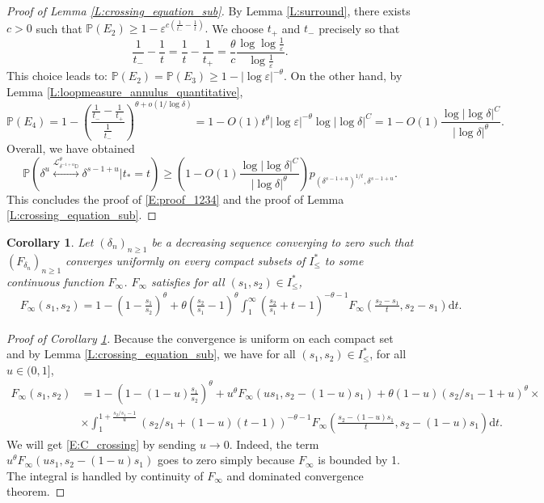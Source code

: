 \documentclass[11pt]{article}
\newtheorem{corollary}[theorem]{Corollary}
\theoremstyle{remark}
\newcommand{\D}{\mathbb{D}}
\newcommand{\Lc}{\mathcal{L}}
\newcommand{\Prob}[1]{\mathbb{P} \left( #1 \right) }
\newcommand{\eps}{\varepsilon}
\renewcommand{\d}{\mathrm{d}}
\numberwithin{equation}{section}
\begin{document}
\begin{proof}[Proof of Lemma \ref{L:crossing_equation_sub}]
By Lemma \ref{L:surround}, there exists $c>0$ such that
$
\Prob{ E_2 } \geq 1 - \eps^{c (\frac{1}{t_-} - \frac1t)}.
$
We choose $t_+$ and $t_-$ precisely so that
\[
\frac{1}{t_-} - \frac{1}{t} = \frac1t - \frac{1}{t_+} = \frac{\theta}{c} \frac{\log \log \frac1\eps}{\log \frac1\eps}.
\]
This choice leads to:
$\Prob{ E_2 } = \Prob{E_3} \geq 1 - |\log \eps|^{-\theta}.$
On the other hand, by Lemma \ref{L:loopmeasure_annulus_quantitative},
\[
\Prob{ E_4 } = 1 - \left( \frac{\frac{1}{t_-} - \frac{1}{t_+}}{ \frac{1}{t_-} } \right)^{\theta + o(1/\log \delta)} = 1 - O(1) t^{\theta} |\log \eps|^{-\theta} \log |\log \delta|^C = 1 - O(1) \frac{\log |\log \delta|^C}{|\log \delta|^\theta}.
\]
Overall, we have obtained 
\[
\Prob{ \delta^u \overset{\Lc_{\delta^{-1+u} \D}^\theta}{\longleftrightarrow} \delta^{s-1+u} \Big\vert t_* = t}
\geq \left( 1 - O(1) \frac{\log |\log \delta|^C}{|\log \delta|^\theta} \right) p_{(\delta^{s-1+u})^{1/t},\delta^{s-1+u}}.
\]
This concludes the proof of \eqref{E:proof_1234} and the proof of Lemma \ref{L:crossing_equation_sub}.
\end{proof}



\begin{corollary}\label{C:crossing}
Let $(\delta_n)_{n \geq 1}$ be a decreasing sequence converging to zero such that $(F_{\delta_n})_{n \geq 1}$ converges uniformly on every compact subsets of $I_\leq^*$ to some continuous function $F_\infty$. $F_\infty$ satisfies for all $(s_1,s_2) \in I_\leq^*$,
\begin{align}\label{E:C_crossing}
& F_\infty(s_1,s_2) =  1 - \left( 1- \frac{s_1}{s_2} \right)^\theta 
+ \theta \left( \frac{s_2}{s_1}-1 \right)^\theta \int_1^\infty \left( \frac{s_2}{s_1} + t-1 \right)^{-\theta-1} F_\infty \left( \frac{s_2-s_1}{t}, s_2-s_1 \right) \d t.
\end{align}
\end{corollary}



\begin{proof}[Proof of Corollary \ref{C:crossing}]
Because the convergence is uniform on each compact set and by Lemma \ref{L:crossing_equation_sub}, we have for all $(s_1,s_2) \in I_\leq^*$, for all $u \in (0,1]$,
\begin{align*}
F_\infty(s_1,s_2) & =  1 - \left( 1 - (1-u) \frac{s_1}{s_2} \right)^\theta + u^\theta F_\infty(us_1,s_2-(1-u)s_1) + \theta (1-u) (s_2/s_1-1+u)^\theta \times \\
& \times \int_1^{1+\frac{s_2/s_1-1}{u}} (s_2/s_1 + (1-u)(t-1))^{-\theta-1} F_\infty \left( \frac{s_2-(1-u)s_1}{t}, s_2-(1-u)s_1 \right) \d t.
\end{align*}
We will get \eqref{E:C_crossing} by sending $u \to 0$. Indeed, the term $u^\theta F_\infty(us_1,s_2-(1-u)s_1)$ goes to zero simply because $F_\infty$ is bounded by 1. The integral is handled by continuity of $F_\infty$ and dominated convergence theorem.
\end{proof}
\end{document}
